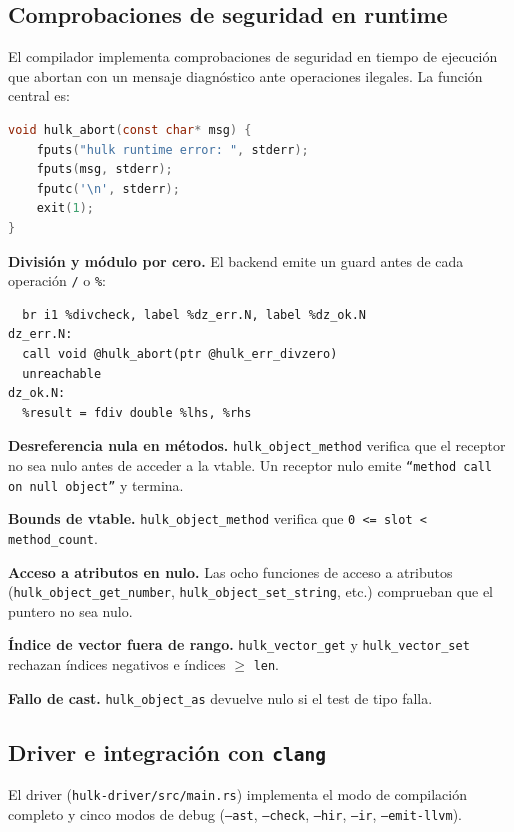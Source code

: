 \documentclass[12pt,letterpaper]{article}
\newcommand{\src}[1]{\texttt{#1}}
\begin{document}
\subsection{Comprobaciones de seguridad en runtime}

El compilador implementa comprobaciones de seguridad en tiempo de ejecución que abortan con un mensaje diagnóstico ante operaciones ilegales. La función central es:

\begin{lstlisting}[language=C,caption={Función de abort del runtime}]
void hulk_abort(const char* msg) {
    fputs("hulk runtime error: ", stderr);
    fputs(msg, stderr);
    fputc('\n', stderr);
    exit(1);
}
\end{lstlisting}

\textbf{División y módulo por cero.} El backend emite un guard antes de cada operación \src{/} o \src{\%}:

\begin{lstlisting}[caption={Guard de división por cero generado por el backend}]
  %divcheck = fcmp oeq double %rhs, 0.0
  br i1 %divcheck, label %dz_err.N, label %dz_ok.N
dz_err.N:
  call void @hulk_abort(ptr @hulk_err_divzero)
  unreachable
dz_ok.N:
  %result = fdiv double %lhs, %rhs
\end{lstlisting}

\textbf{Desreferencia nula en métodos.} \src{hulk\_object\_method} verifica que el receptor no sea nulo antes de acceder a la vtable. Un receptor nulo emite \texttt{``method call on null object''} y termina.

\textbf{Bounds de vtable.} \src{hulk\_object\_method} verifica que \src{0 <= slot < method\_count}.

\textbf{Acceso a atributos en nulo.} Las ocho funciones de acceso a atributos (\src{hulk\_object\_get\_number}, \src{hulk\_object\_set\_string}, etc.) comprueban que el puntero no sea nulo.

\textbf{Índice de vector fuera de rango.} \src{hulk\_vector\_get} y \src{hulk\_vector\_set} rechazan índices negativos e índices $\geq$ \src{len}.

\textbf{Fallo de cast.} \src{hulk\_object\_as} devuelve nulo si el test de tipo falla.

\subsection{Driver e integración con \src{clang}}

El driver (\src{hulk-driver/src/main.rs}) implementa el modo de compilación completo y cinco modos de debug (\src{--ast}, \src{--check}, \src{--hir}, \src{--ir}, \src{--emit-llvm}).
\end{document}
